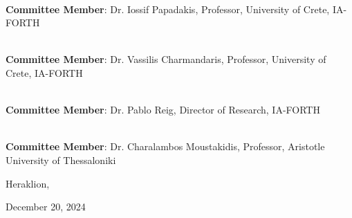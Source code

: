 \documentclass[main.tex]{subfiles}
\begin{document}
    \noindent\hrulefill \\
    \noindent\textbf{Committee Member}: Dr. Iossif Papadakis, Professor, University of Crete, IA-FORTH \\
    \vspace*{0.5cm}  
    
    \noindent\hrulefill \\
    \noindent\textbf{Committee Member}: Dr. Vassilis Charmandaris, Professor, University of Crete, IA-FORTH \\
    \vspace*{0.5cm}   

    \noindent\hrulefill \\
    \noindent\textbf{Committee Member}: Dr. Pablo Reig, Director of Research, IA-FORTH \\
    \vspace*{0.5cm}  

    \noindent\hrulefill \\
    \noindent\textbf{Committee Member}: Dr. Charalambos Moustakidis, Professor, Aristotle University of Thessaloniki \\
    \vspace*{0.5cm}  

    
    
    \begin{center}
        \vspace*{\fill}
        Heraklion, \date{}{December 20, 2024}
    \end{center}
\end{document}
